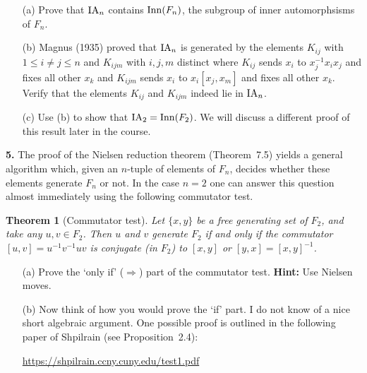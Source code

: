 \documentclass[12pt]{amsart}
\newtheorem* {Theorem}    {Theorem}
\begin{document}
\begin{itemize}
\item[(a)] Prove that ${\rm IA}_n$ contains ${\rm Inn}(F_n)$, the subgroup of inner automorphsisms of $F_n$.
\item[(b)] Magnus (1935) proved that ${\rm IA}_n$ is generated by the elements
$K_{ij}$ with $1\leq i\neq j\leq n$ and $K_{ijm}$ with $i,j,m$ distinct
where $K_{ij}$ sends $x_i$ to $x_j^{-1}x_i x_j$ and fixes all other $x_k$
and $K_{ijm}$ sends $x_i$ to $x_i [x_j,x_m]$ and fixes all other $x_k$.
Verify that the elements $K_{ij}$ and $K_{ijm}$ indeed lie in ${\rm IA}_n$.
\item[(c)] Use (b) to show that ${\rm IA}_2={\rm Inn}(F_2)$. We will discuss a different
proof of this result later in the course.
\end{itemize}

{\bf 5.} The proof of the Nielsen reduction theorem (Theorem~7.5) yields a general algorithm
which, given an $n$-tuple of elements of $F_n$, decides whether these elements
generate $F_n$ or not. In the case $n=2$ one can answer this question almost
immediately using the following commutator test.
\begin{Theorem}[Commutator test] Let $\{x,y\}$ be a free generating set of $F_2$,
and take any $u,v\in F_2$. Then $u$ and $v$ generate $F_2$ if and only if
the commutator $[u,v]=u^{-1}v^{-1}uv$ is conjugate (in $F_2$) to
$[x,y]$ or $[y,x]=[x,y]^{-1}$.
\end{Theorem}
\begin{itemize}
\item[(a)] Prove the `only if' ($\Rightarrow$) part of the commutator test.
{\bf Hint:} Use Nielsen moves.
\item[(b)] Now think of how you would prove the `if' part. I do not know
of a nice short algebraic argument. One possible proof is outlined in the following
paper of Shpilrain (see Proposition~2.4):

\url{https://shpilrain.ccny.cuny.edu/test1.pdf}

\end{itemize} 
\end{document}
